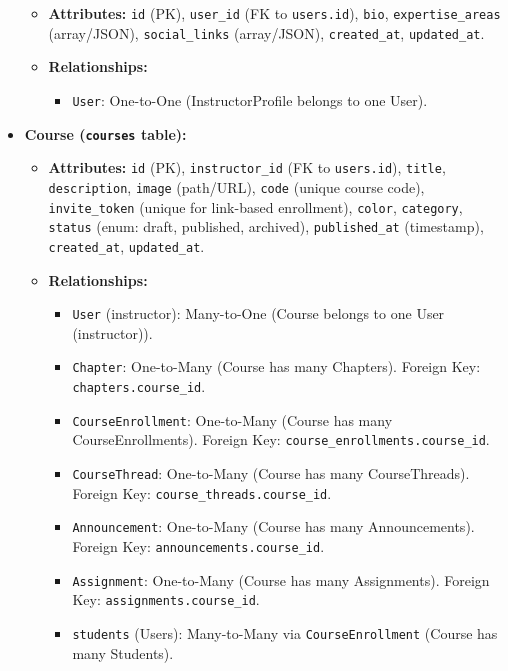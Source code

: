 \documentclass[12pt,a4paper]{article}
\begin{document}
\begin{itemize}
    \begin{itemize}
        \item \textbf{Attributes:} \texttt{id} (PK), \texttt{user\_id} (FK to \texttt{users.id}), \texttt{bio}, \texttt{expertise\_areas} (array/JSON), \texttt{social\_links} (array/JSON), \texttt{created\_at}, \texttt{updated\_at}.
        \item \textbf{Relationships:}
        \begin{itemize}
            \item \texttt{User}: One-to-One (InstructorProfile belongs to one User).
        \end{itemize}
    \end{itemize}
    \item \textbf{Course (\texttt{courses} table):}
    \begin{itemize}
        \item \textbf{Attributes:} \texttt{id} (PK), \texttt{instructor\_id} (FK to \texttt{users.id}), \texttt{title}, \texttt{description}, \texttt{image} (path/URL), \texttt{code} (unique course code), \texttt{invite\_token} (unique for link-based enrollment), \texttt{color}, \texttt{category}, \texttt{status} (enum: draft, published, archived), \texttt{published\_at} (timestamp), \texttt{created\_at}, \texttt{updated\_at}.
        \item \textbf{Relationships:}
        \begin{itemize}
            \item \texttt{User} (instructor): Many-to-One (Course belongs to one User (instructor)).
            \item \texttt{Chapter}: One-to-Many (Course has many Chapters). Foreign Key: \texttt{chapters.course\_id}.
            \item \texttt{CourseEnrollment}: One-to-Many (Course has many CourseEnrollments). Foreign Key: \texttt{course\_enrollments.course\_id}.
            \item \texttt{CourseThread}: One-to-Many (Course has many CourseThreads). Foreign Key: \texttt{course\_threads.course\_id}.
            \item \texttt{Announcement}: One-to-Many (Course has many Announcements). Foreign Key: \texttt{announcements.course\_id}.
            \item \texttt{Assignment}: One-to-Many (Course has many Assignments). Foreign Key: \texttt{assignments.course\_id}.
            \item \texttt{students} (Users): Many-to-Many via \texttt{CourseEnrollment} (Course has many Students).

\end{itemize}
\end{itemize}
\end{itemize}
\end{document}
